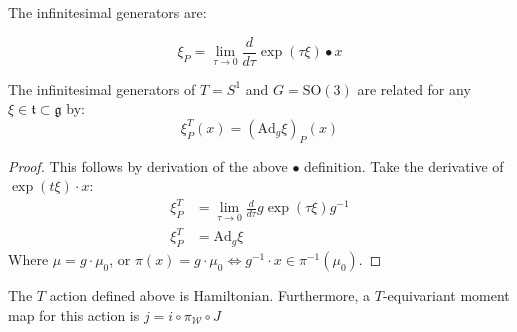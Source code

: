 \begin{defn}
The infinitesimal generators are:

\begin{equation}
\xi_{P} = \lim_{\tau \to 0} \frac{d}{d \tau} \exp(\tau \xi) \bullet x
\end{equation}
\end{defn}

\begin{lemma}
The infinitesimal generators of $T = S^{1}$ and $G = \mathrm{SO}(3)$ are related for any $\xi \in \mathfrak{t} \subset \mathfrak{g}$ by:
\begin{equation}
\xi_{P}^{T}(x) = (\mathrm{Ad}_{g} \xi)_{P} (x)
\end{equation}
\end{lemma}

\begin{proof}
This follows by derivation of the above $\bullet$ definition. Take the derivative of $\exp(t \xi) \cdot x$:
\begin{align}
\xi_{P}^{T} &= \lim_{\tau \to 0} \frac{d}{d \tau} g \exp(\tau \xi) g^{-1}\\
\xi_{P}^{T} &= \mathrm{Ad}_{g} \xi
\end{align}
Where $\mu = g \cdot \mu_{0}$, or $\pi(x) = g \cdot \mu_{0} \Longleftrightarrow g^{-1} \cdot x \in \pi^{-1}(\mu_{0})$.
\end{proof}

\begin{theorem}\label{thm:t-action-hamiltonian}
The $T$ action defined above is Hamiltonian. Furthermore, a $T$-equivariant moment map for this action is $j = i \circ \pi_{\mathcal{W}} \circ J$ 
\end{theorem}

